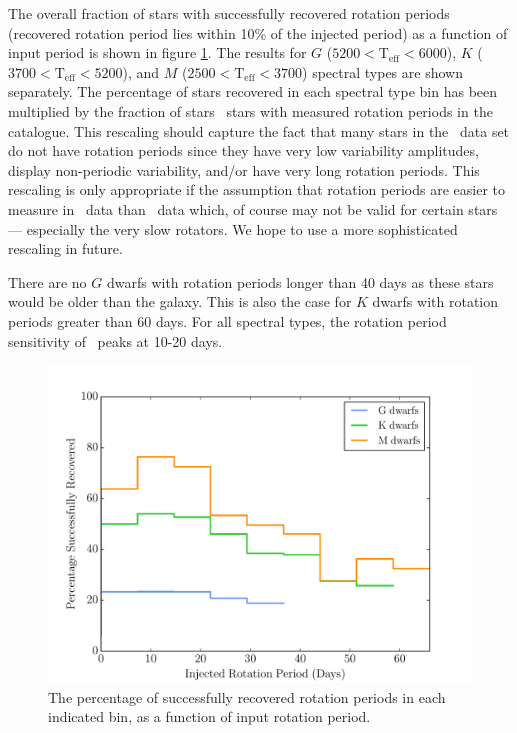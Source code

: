 The overall fraction of stars with successfully recovered rotation periods
(recovered rotation period lies within 10\% of the injected period) as a
function of input period is shown in figure \ref{fig:kickass}.
The results for $G$ ($5200<\mathrm{T}_{\mathrm{eff}}<6000$), $K$
($3700<\mathrm{T}_{\mathrm{eff}}<5200$), and $M$
($2500<\mathrm{T}_{\mathrm{eff}}<3700$) spectral types are shown separately.
The percentage of stars recovered in each spectral type bin has been
multiplied by the fraction of stars \kepler\ stars with measured rotation
periods in the \citet{Mcquillan2014} catalogue.
This rescaling should capture the fact that many stars in the \kepler\ data
set do not have rotation periods since they have very low variability
amplitudes, display non-periodic variability, and/or have very long rotation
periods.
This rescaling is only appropriate if the assumption that rotation periods are
easier to measure in \kepler\ data than \LSST\ data which, of course may not
be valid for certain stars --- especially the very slow rotators.
We hope to use a more sophisticated rescaling in future.

There are no $G$ dwarfs with rotation periods longer than 40 days as these
stars would be older than the galaxy.
This is also the case for $K$ dwarfs with rotation periods greater than 60
days.
For all spectral types, the rotation period sensitivity of \LSST\ peaks at
10-20 days.

\begin{figure}
\begin{center}
\includegraphics[width=6in, clip=true]{figures/recovered_hist_-10.pdf}
\caption[\LSST\ rotation period recovery results for different spectral types]
{The percentage of successfully recovered rotation periods in each indicated
bin, as a function of input rotation period.}
\label{fig:kickass}
\end{center}
\end{figure}


